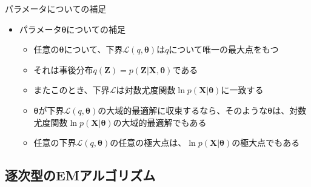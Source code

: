 \documentclass[dvipdfmx,notheorems,t]{beamer}
\begin{document}
\begin{frame}{パラメータについての補足}

\begin{itemize}
	\item パラメータ$\bm{\theta}$についての補足
	\begin{itemize}
		\item 任意の$\bm{\theta}$について、下界$\mathcal{L}(q, \bm{\theta})$は$q$について\alert{唯一の最大点}をもつ
		\item それは事後分布$q(\bm{Z}) = p(\bm{Z} | \bm{X}, \bm{\theta})$である
		\item またこのとき、下界$\mathcal{L}$は対数尤度関数$\ln p(\bm{X} | \bm{\theta})$に一致する
		\newline
		\item $\bm{\theta}$が下界$\mathcal{L}(q, \bm{\theta})$の大域的最適解に収束するなら、そのような$\bm{\theta}$は、対数尤度関数$\ln p(\bm{X} | \bm{\theta})$の大域的最適解でもある
		\item 任意の下界$\mathcal{L}(q, \bm{\theta})$の任意の極大点は、$\ln p(\bm{X} | \bm{\theta})$の極大点でもある
	\end{itemize}
\end{itemize}

\end{frame}

\subsection{逐次型のEMアルゴリズム}
\end{document}
